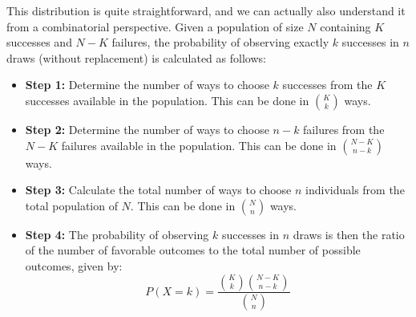 This distribution is quite straightforward, and we can actually also understand it from a combinatorial perspective. Given a population of size \( N \) containing \( K \) successes and \( N - K \) failures, the probability of observing exactly \( k \) successes in \( n \) draws (without replacement) is calculated as follows:

\begin{itemize}
    \item \textbf{Step 1:} Determine the number of ways to choose \( k \) successes from the \( K \) successes available in the population. This can be done in \( \binom{K}{k} \) ways.
    \item \textbf{Step 2:} Determine the number of ways to choose \( n - k \) failures from the \( N - K \) failures available in the population. This can be done in \( \binom{N-K}{n-k} \) ways.
    \item \textbf{Step 3:} Calculate the total number of ways to choose \( n \) individuals from the total population of \( N \). This can be done in \( \binom{N}{n} \) ways.
    \item \textbf{Step 4:} The probability of observing \( k \) successes in \( n \) draws is then the ratio of the number of favorable outcomes to the total number of possible outcomes, given by:
    \[
    P(X = k) = \frac{\binom{K}{k} \binom{N-K}{n-k}}{\binom{N}{n}}
    \]
\end{itemize}

